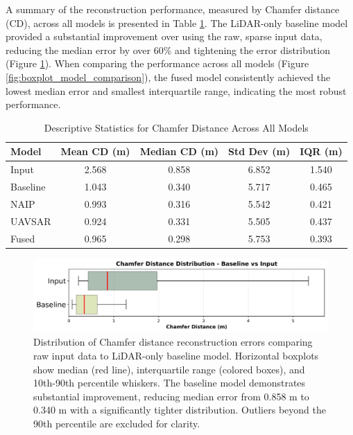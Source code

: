 \documentclass[preprints,article,accept,pdftex,moreauthors]{Definitions/mdpi}
\begin{document}
A summary of the reconstruction performance, measured by Chamfer distance (CD), across all models is presented in Table \ref{tab:descriptive_stats}. The LiDAR-only baseline model provided a substantial improvement over using the raw, sparse input data, reducing the median error by over 60\% and tightening the error distribution (Figure \ref{fig:ebaseline_v_input_boxplot}). When comparing the performance across all models (Figure \ref{fig:boxplot_model_comparison}), the fused model consistently achieved the lowest median error and smallest interquartile range, indicating the most robust performance.

\begin{table}[htbp]
\centering
\caption{Descriptive Statistics for Chamfer Distance Across All Models}
\begin{tabular}{lcccc}
\toprule
\textbf{Model} & \textbf{Mean CD (m)} & \textbf{Median CD (m)} & \textbf{Std Dev (m)} & \textbf{IQR (m)} \\
\midrule
Input & 2.568 & 0.858 & 6.852 & 1.540 \\
Baseline & 1.043 & 0.340 & 5.717 & 0.465 \\
NAIP & 0.993 & 0.316 & 5.542 & 0.421 \\
UAVSAR & 0.924 & 0.331 & 5.505 & 0.437 \\
Fused & 0.965 & 0.298 & 5.753 & 0.393 \\
\bottomrule
\end{tabular}
\label{tab:descriptive_stats}
\end{table}



\begin{figure}
    \centering
    \includegraphics[width=0.9\linewidth]{manuscript//figures/baseline_v_input_boxplot.png}
    \caption{Distribution of Chamfer distance reconstruction errors comparing raw input data to LiDAR-only baseline model. Horizontal boxplots show median (red line), interquartile range (colored boxes), and 10th-90th percentile whiskers. The baseline model demonstrates substantial improvement, reducing median error from 0.858 m to 0.340 m with a significantly tighter distribution. Outliers beyond the 90th percentile are excluded for clarity.}
    \label{fig:ebaseline_v_input_boxplot}
\end{figure}
\end{document}
